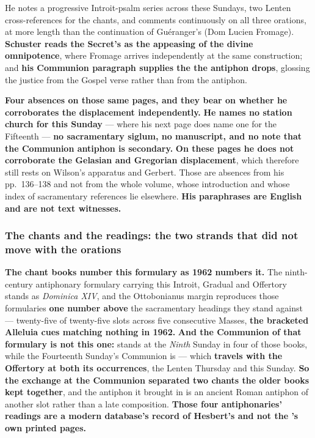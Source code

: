 He notes a progressive Introit-psalm series across these Sundays, two Lenten
cross-references for the chants, and comments continuously on all three
orations, at more length than the continuation of Guéranger's  (Dom Lucien Fromage). \textbf{Schuster reads the Secret's
 as the appeasing of the divine
omnipotence}, where Fromage arrives independently at the same construction;
and \textbf{his Communion paragraph supplies the  the
antiphon drops}, glossing the justice from the Gospel verse rather than from the
antiphon.

\textbf{Four absences on those same pages, and they bear on whether he
corroborates the displacement independently.} \textbf{He names no
station church for this Sunday} --- where his next page does name one for the
Fifteenth --- \textbf{no sacramentary siglum, no manuscript, and no note that
the Communion antiphon is secondary.} \textbf{On these pages he does not
corroborate the Gelasian and Gregorian displacement}, which therefore still
rests on Wilson's apparatus and Gerbert. Those are absences from his
pp.~136--138 and not from the whole volume, whose introduction and whose index of
sacramentary references lie elsewhere. \textbf{His paraphrases are English and
are not text witnesses.}

\subsubsection*{The chants and the readings: the two strands that did not move with the orations}

\textbf{The chant books number this formulary as 1962 numbers it.} The
ninth-century antiphonary formulary carrying this Introit, Gradual and Offertory
stands as \emph{Dominica XIV}, and the Ottobonianus margin reproduces those
formularies \textbf{one number above} the sacramentary headings they stand
against --- twenty-five of twenty-five slots across five consecutive Masses,
\textbf{the bracketed Alleluia cues matching nothing in 1962.} \textbf{And the
Communion of that formulary is not this one:}  stands at
the \emph{Ninth} Sunday in four of those books, while the Fourteenth Sunday's
Communion is  --- which \textbf{travels with the
Offertory  at both its occurrences}, the Lenten
Thursday and this Sunday. \textbf{So the exchange at the Communion
separated two chants the older books kept together}, and the antiphon it
brought in is an ancient Roman antiphon of another slot rather than a late
composition. \textbf{Those four antiphonaries' readings are a modern database's record of
Hesbert's  and not the 's
own printed pages.}

